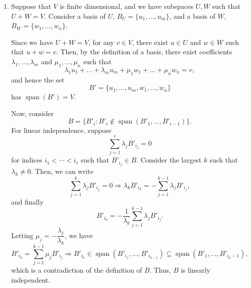 \documentclass[12pt]{article}
\begin{document}
\begin{enumerate}
    Therefore, we can conclude $B'$ is also a basis, meaning $B' =
    B.$ Therefore, for all $b_i,$ there exists some $b_j$ such that
    $$
    2b_i = b_j \Rightarrow 2b_i - b_j = 0.
    $$
    \begin{itemize}
      \item If $i = j,$ we must have $2b_i = b_i,$ which is a
        contradiction since $b_i \neq 0$ for all indices $i.$

      \item Otherwise, consider a single such $(i, j)$ pair where $i
        \neq j$. Then the non-trivial linear combination on $B$ with
        coefficients
        $$
        \lambda_i = 2, \lambda_j = -1, \lambda_{k\neq i, j} = 0
        $$
        produces the zero vector, which is a contradiction.
    \end{itemize}

    Thus, $B' \neq B,$ and there are $\geq 2$ basis sets on $U,$
    deriving a contradiction. Thus, for $U$ to have a single basis,
    it's basis set must be $\emptyset.$

  \item Suppose that $V$ is finite dimensional, and we have subspaces
    $U, W$ such that $U + W = V.$ Consider a basis of $U$, $B_U =
    \{u_1, \ldots, u_m\}$, and a basis of $W$, $B_W = \{w_1, \ldots, w_n\}.$

    Since we have $U + W = V$, for any $v \in V$, there exist $u \in
    U$ and $w \in W$ such that $u + w = v.$ Then, by the definition
    of a basis, there exist coefficients $\lambda_1, \ldots,
    \lambda_m$ and $\mu_1, \ldots, \mu_n$ such that
    $$
    \lambda_1 u_1 + \ldots + \lambda_m u_m + \mu_1 w_1 + \ldots + \mu_n w_n = v,
    $$
    and hence the set
    $$
    B' = \{u_1, \ldots, u_m, w_1, \ldots, w_n\}
    $$
    has $\operatorname{span}(B') = V.$

    Now, consider
    $$
    B = \{B'_i : B'_i \notin \operatorname{span}(B'_1, \ldots, B'_{i-1})\}.
    $$
    For linear independence, suppose
    $$
    \sum_{j=1}^{r} \lambda_j B'_{i_j} = 0
    $$
    for indices $i_1 < \cdots < i_r$ such that $B'_{i_j} \in B.$
    Consider the largest $k$ such that $\lambda_k \neq 0.$ Then, we can write
    $$
    \sum_{j=1}^{k} \lambda_j B'_{i_j} = 0
    \Rightarrow
    \lambda_k B'_{i_k} = -\sum_{j=1}^{k-1} \lambda_j B'_{i_j},
    $$
    and finally
    $$
    B'_{i_k} = -\frac{1}{\lambda_k}\sum_{j=1}^{k-1} \lambda_j B'_{i_j}.
    $$
    Letting $\mu_j = -\dfrac{\lambda_j}{\lambda_k}$, we have
    $$
    B'_{i_k} = \sum_{j=1}^{k-1} \mu_j B'_{i_j}
    \Rightarrow
    B'_{i_k} \in \operatorname{span}(B'_{i_1}, \ldots, B'_{i_{k-1}})
    \subseteq
    \operatorname{span}(B'_1, \ldots, B'_{i_k-1}),
    $$
    which is a contradiction of the definition of $B.$ Thus, $B$ is
    linearly independent.


\end{enumerate}
\end{document}
